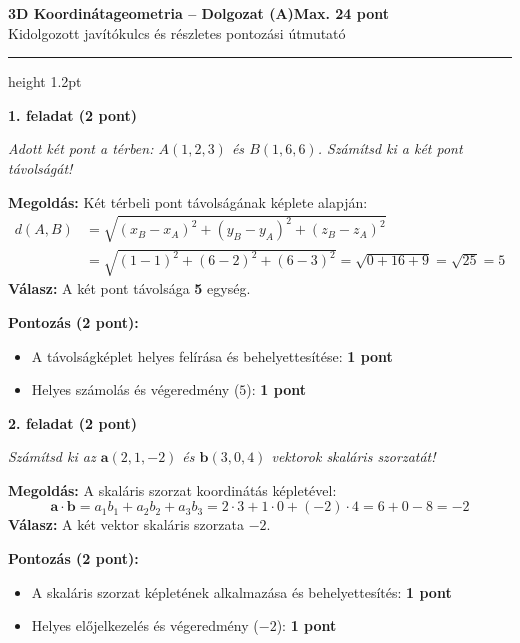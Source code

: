 \documentclass[11pt, a4paper]{article}
\begin{document}
\setlength{\abovedisplayskip}{6pt}
\setlength{\belowdisplayskip}{6pt}
\setlength{\abovedisplayshortskip}{4pt}
\setlength{\belowdisplayshortskip}{4pt}

{\color{primary}\Large\bfseries 3D Koordinátageometria – Dolgozat (A)}\hfill{\color{muted}\large\bfseries Max. 24 pont}\\[3pt]
{\color{muted}\normalsize Kidolgozott javítókulcs és részletes pontozási útmutató}
\vspace{4pt}
{\color{primary}\hrule height 1.2pt}
\vspace{10pt}

{\color{primary}\bfseries 1. feladat (2 pont)}

\textit{Adott két pont a térben: $A(1,2,3)$ és $B(1,6,6)$. Számítsd ki a két pont távolságát!}

\textbf{Megoldás:} Két térbeli pont távolságának képlete alapján:
\[
\begin{aligned}
d(A,B) &= \sqrt{(x_B - x_A)^2 + (y_B - y_A)^2 + (z_B - z_A)^2} \\
       &= \sqrt{(1 - 1)^2 + (6 - 2)^2 + (6 - 3)^2} = \sqrt{0 + 16 + 9} = \sqrt{25} = 5
\end{aligned}
\]
\textbf{Válasz:} A két pont távolsága \textbf{5} egység.

{\color{muted}\small\textbf{Pontozás (2 pont):}}
\begin{itemize}
    \item {\color{muted}\small A távolságképlet helyes felírása és behelyettesítése: \textbf{1 pont}}
    \item {\color{muted}\small Helyes számolás és végeredmény ($5$): \textbf{1 pont}}
\end{itemize}

\vspace{6pt}{\color{rulegray}\hrule}\vspace{8pt}

{\color{primary}\bfseries 2. feladat (2 pont)}

\textit{Számítsd ki az $\mathbf{a}(2,1,-2)$ és $\mathbf{b}(3,0,4)$ vektorok skaláris szorzatát!}

\textbf{Megoldás:} A skaláris szorzat koordinátás képletével:
\[
\mathbf{a} \cdot \mathbf{b} = a_1 b_1 + a_2 b_2 + a_3 b_3 = 2 \cdot 3 + 1 \cdot 0 + (-2) \cdot 4 = 6 + 0 - 8 = -2
\]
\textbf{Válasz:} A két vektor skaláris szorzata \textbf{$-2$}.

{\color{muted}\small\textbf{Pontozás (2 pont):}}
\begin{itemize}
    \item {\color{muted}\small A skaláris szorzat képletének alkalmazása és behelyettesítés: \textbf{1 pont}}
    \item {\color{muted}\small Helyes előjelkezelés és végeredmény ($-2$): \textbf{1 pont}}
\end{itemize}
\end{document}
